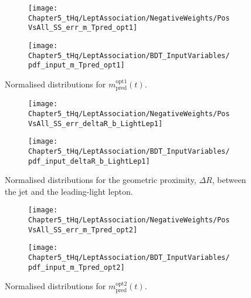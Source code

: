 \begin{figure}[h]
\centering
\begin{subfigure}{.46\textwidth}
  \centering
  \texttt{[image: Chapter5\_tHq/LeptAssociation/NegativeWeights/PosVsAll\_SS\_err\_m\_Tpred\_opt1]}
\end{subfigure}%
\begin{subfigure}{.46\textwidth}
  \centering
  \texttt{[image: Chapter5\_tHq/LeptAssociation/BDT\_InputVariables/pdf\_input\_m\_Tpred\_opt1]}
\end{subfigure}
\caption{Normalised distributions for $m^{\text{opt1}}_{\text{pred}}(t)$.}
\label{fig:Appendix:BDTVARS:LeptonAssignment:m_Tpred_opt1}
\end{figure}

\begin{figure}[h]
\centering
\begin{subfigure}{.46\textwidth}
  \centering
  \texttt{[image: Chapter5\_tHq/LeptAssociation/NegativeWeights/PosVsAll\_SS\_err\_deltaR\_b\_LightLep1]}
\end{subfigure}%
\begin{subfigure}{.46\textwidth}
  \centering
  \texttt{[image: Chapter5\_tHq/LeptAssociation/BDT\_InputVariables/pdf\_input\_deltaR\_b\_LightLep1]}
\end{subfigure}
\caption{Normalised distributions for the geometric proximity, $\Delta R$, between the \btagged jet and the leading-light lepton.}
\label{fig:Appendix:BDTVARS:LeptonAssignment:deltaR_b_LightLep1}
\end{figure}

\begin{figure}[h]
\centering
\begin{subfigure}{.46\textwidth}
  \centering
  \texttt{[image: Chapter5\_tHq/LeptAssociation/NegativeWeights/PosVsAll\_SS\_err\_m\_Tpred\_opt2]}
\end{subfigure}%
\begin{subfigure}{.46\textwidth}
  \centering
  \texttt{[image: Chapter5\_tHq/LeptAssociation/BDT\_InputVariables/pdf\_input\_m\_Tpred\_opt2]}
\end{subfigure}
\caption{Normalised distributions for $m^{\text{opt2}}_{\text{pred}}(t)$.}
\label{fig:Appendix:BDTVARS:LeptonAssignment:m_Tpred_opt2}
\end{figure}

